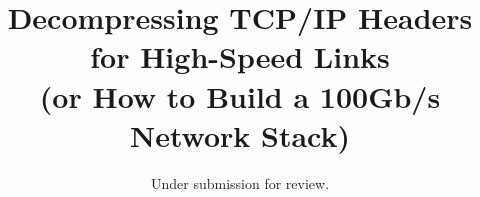 \documentclass[letter,twocolumn,10pt]{sig-alternate-10pt}
\newcommand{\system}{Q-Jump}
\begin{document}


\title{ Decompressing TCP/IP Headers for High-Speed Links \\ (or How to Build a 100Gb/s Network Stack)}


\author{
\alignauthor
Under submission for review.
}

\maketitle

















{
\small
\setlength\bibsep{0.09em}
\balance



}

\end{document}
